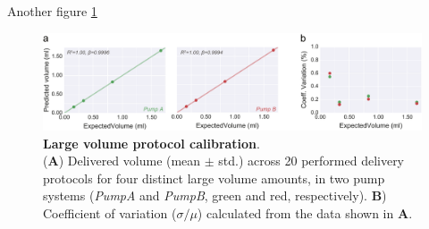 Another figure \ref{fig:LargeVolumeCalibration}
\begin{figure}[ht] 
	\centering
	\includegraphics[width=1.0\linewidth]{Figures/Artboard 6.pdf}
	\caption{\textbf{Large volume protocol calibration}.\\
	(\textbf{A}) Delivered volume (mean $\pm$ std.) across 20 performed delivery protocols for four distinct large volume amounts, in two pump systems (\textit{PumpA} and \textit{PumpB}, green and red, respectively). \textbf{B}) Coefficient of variation ($\sigma / \mu$) calculated from the data shown in \textbf{A}.}

	\label{fig:LargeVolumeCalibration} 
\end{figure}


